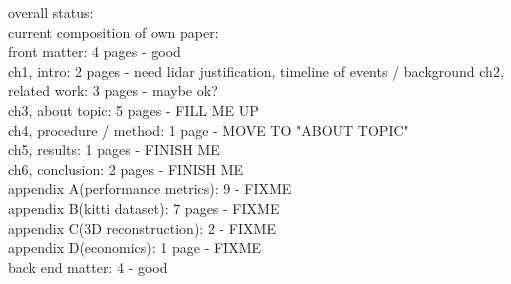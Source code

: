 overall status:  \\
current composition of own paper: \\
front matter: 4 pages - good \\
ch1, intro: 2 pages - need lidar justification, timeline of events / background
ch2, related work: 3 pages - maybe ok? \\
ch3, about topic: 5 pages - FILL ME UP \\
ch4, procedure / method: 1 page - MOVE TO "ABOUT TOPIC" \\
ch5, results: 1 pages - FINISH ME  \\
ch6, conclusion: 2 pages - FINISH ME \\
appendix A(performance metrics): 9 - FIXME \\
appendix B(kitti dataset): 7 pages - FIXME \\
appendix C(3D reconstruction): 2 - FIXME \\
appendix D(economics): 1 page - FIXME \\
back end matter: 4 - good \\
